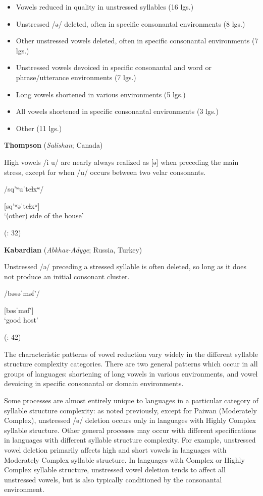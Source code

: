 \begin{itemize}
\item Vowels reduced in quality in unstressed syllables (16 lgs.)
\item Unstressed /ə/ deleted, often in specific consonantal environments {(8 lgs.)}
\item Other unstressed vowels deleted, often in specific consonantal environments (7 lgs.)
\item Unstressed vowels devoiced in specific consonantal and word or phrase/utterance environments (7 lgs.)
\item Long vowels shortened in various environments (5 lgs.)
\item All vowels shortened in specific consonantal environments  {(3 lgs.)}
\item Other (11 lgs.)
\end{itemize}

\ea  \textbf{Thompson} (\textit{Salishan}; Canada)

High vowels /i u/ are nearly always realized as [ə] when preceding the main stress, except for when /u/ occurs between two velar consonants. 

/sq’ʷuˈteɬxʷ/

[sq’ʷəˈteɬxʷ]\\
\glt ‘(other) side of the house’

(\citealt{ThompsonThompson1992}: 32)

\ex  \textbf{Kabardian} (\textit{Abkhaz-Adyge}; Russia, Turkey) 

Unstressed /ə/ preceding a stressed syllable is often deleted, so long as it does not produce an initial consonant cluster.

/bəsəˈməf’/

[bəsˈməf’]\\
\glt ‘good host’

(\citealt{GordonApplebaum2010}: 42)
\z
\z

  The characteristic patterns of vowel reduction vary widely in the different syllable structure complexity categories. There are two general patterns which occur in all groups of languages: shortening of long vowels in various environments, and vowel devoicing in specific consonantal or domain environments. 

  Some processes are almost entirely unique to languages in a particular category of syllable structure complexity: as noted previously, except for Paiwan (Moderately Complex), unstressed /ə/ deletion occurs only in languages with Highly Complex syllable structure. Other general processes may occur with different specifications in languages with different syllable structure complexity. For example, unstressed vowel deletion primarily affects high and short vowels in languages with Moderately Complex syllable structure. In languages with Complex or Highly Complex syllable structure, unstressed vowel deletion tends to affect all unstressed vowels, but is also typically conditioned by the consonantal environment.

